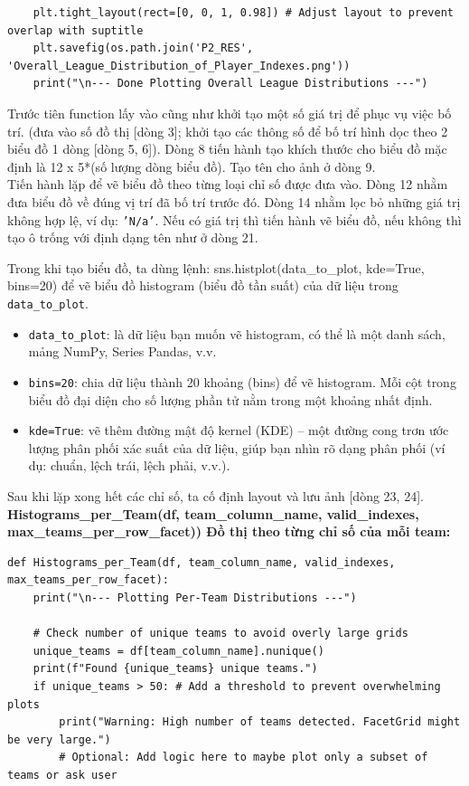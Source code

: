 \documentclass[12pt]{report}
\begin{document}
{\begin{lstlisting}
    plt.tight_layout(rect=[0, 0, 1, 0.98]) # Adjust layout to prevent overlap with suptitle
    plt.savefig(os.path.join('P2_RES', 'Overall_League_Distribution_of_Player_Indexes.png'))
    print("\n--- Done Plotting Overall League Distributions ---")
\end{lstlisting}
Trước tiên function lấy vào cũng như khởi tạo một số giá trị để phục vụ việc bố trí. (đưa vào số đồ thị [dòng 3]; khởi tạo các thông số để bố trí hình dọc theo 2 biểu đồ 1 dòng [dòng 5, 6]). Dòng 8 tiến hành tạo khích thước cho biểu đồ mặc định là 12 x 5*(số lượng dòng biểu đồ). Tạo tên cho ảnh ở dòng 9.\\
Tiến hành lặp để vẽ biểu đồ theo từng loại chỉ số được đưa vào. Dòng 12 nhằm đưa biểu đồ về đúng vị trí đã bố trí trước đó. Dòng 14 nhằm lọc bỏ những giá trị không hợp lệ, ví dụ: \texttt{'N/a'}. Nếu có giá trị thì tiến hành vẽ biểu đồ, nếu không thì tạo ô trống với định dạng tên như ở dòng 21.

Trong khi tạo biểu đồ, ta dùng lệnh:
sns.histplot(data\_to\_plot, kde=True, bins=20)
để vẽ biểu đồ histogram (biểu đồ tần suất) của dữ liệu trong \texttt{data\_to\_plot}.

\begin{itemize}
    \item \texttt{data\_to\_plot}: là dữ liệu bạn muốn vẽ histogram, có thể là một danh sách, mảng NumPy, Series Pandas, v.v.
    \item \texttt{bins=20}: chia dữ liệu thành 20 khoảng (bins) để vẽ histogram. Mỗi cột trong biểu đồ đại diện cho số lượng phần tử nằm trong một khoảng nhất định.
    \item \texttt{kde=True}: vẽ thêm đường mật độ kernel (KDE) – một đường cong trơn ước lượng phân phối xác suất của dữ liệu, giúp bạn nhìn rõ dạng phân phối (ví dụ: chuẩn, lệch trái, lệch phải, v.v.).
\end{itemize}
Sau khi lặp xong hết các chỉ số, ta cố định layout và lưu ảnh [dòng 23, 24].\\
\textbf* { Histograms\_per\_Team(df, team\_column\_name, valid\_indexes, max\_teams\_per\_row\_facet)) Đồ thị theo từng chỉ số của mỗi team: }
\begin{lstlisting}
def Histograms_per_Team(df, team_column_name, valid_indexes, max_teams_per_row_facet):
    print("\n--- Plotting Per-Team Distributions ---")

    # Check number of unique teams to avoid overly large grids
    unique_teams = df[team_column_name].nunique()
    print(f"Found {unique_teams} unique teams.")
    if unique_teams > 50: # Add a threshold to prevent overwhelming plots
        print("Warning: High number of teams detected. FacetGrid might be very large.")
        # Optional: Add logic here to maybe plot only a subset of teams or ask user


\end{lstlisting}}
\end{document}
